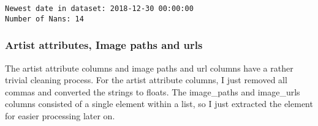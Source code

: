 \documentclass[11pt]{article}
\begin{document}
    \begin{Verbatim}[commandchars=\\\{\},fontsize=\footnotesize]
Newest date in dataset: 2018-12-30 00:00:00
Number of Nans: 14

    \end{Verbatim}

    \subsubsection{Artist attributes, Image paths and urls}

The artist attribute columns and image paths and url columns have a
rather trivial cleaning process. For the artist attribute columns, I
just removed all commas and converted the strings to floats. The
image\_paths and image\_urls columns consisted of a single element within
a list, so I just extracted the element for easier processing later on.
\end{document}
